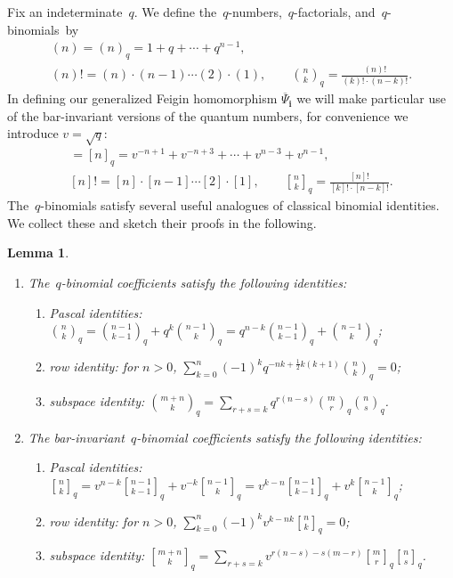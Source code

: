 \documentclass[11pt]{article}
\numberwithin{equation}{section}
\newtheorem{Lemma}[Theorem]{Lemma}
\begin{document}
Fix an indeterminate~$q$.
We def\/ine the~$q$-numbers,~$q$-factorials, and~$q$-binomials~by
\begin{gather*}
(n)=(n)_q=1+q+\cdots+q^{n-1},
\\
(n)!=(n)\cdot(n-1)\cdots(2)\cdot(1),
\qquad
{n\choose k}_q=\frac{(n)!}{(k)!\cdot(n-k)!}.
\end{gather*}
In def\/ining our generalized Feigin homomorphism $\overline\Psi_\mathbf{i}$ we will make particular use of the
bar-invariant versions of the quantum numbers, for convenience we introduce $v=\sqrt{q}$:
\begin{gather*}
[n]=[n]_q=v^{-n+1}+v^{-n+3}+\cdots+v^{n-3}+v^{n-1},
\\
[n]!=[n]\cdot[n-1]\cdots[2]\cdot[1],
\qquad
{n\brack k}_q=\frac{[n]!}{[k]!\cdot[n-k]!}.
\end{gather*}
The~$q$-binomials satisfy several useful analogues of classical binomial identities.
We collect these and sketch their proofs in the following.
\begin{Lemma}\label{lem:binomial_identities}\qquad
\begin{enumerate}\itemsep=0pt
\item[$1.$] The~$q$-binomial coefficients satisfy the following identities:
\begin{enumerate}[\upshape (a)]\itemsep=0pt
\item Pascal identities: ${n\choose k}_q={n-1\choose k-1}_q+q^k{n-1\choose k}_q=q^{n-k}{n-1\choose k-1}_q+{n-1\choose k}_q$;
\item row identity: for $n>0$, $\sum\limits_{k=0}^n (-1)^k q^{-nk+\frac{1}{2} k(k+1)}{n\choose k}_q=0$;
\item subspace identity: ${m+n\choose k}_q=\sum\limits_{r+s=k}q^{r(n-s)}{m\choose r}_q{n\choose s}_q$.
\end{enumerate}
\item[$2.$] The bar-invariant~$q$-binomial coefficients satisfy the following identities:
\begin{enumerate}[\upshape (a)]\itemsep=0pt
\item Pascal identities: ${n\brack k}_q=v^{n-k}{n-1\brack k-1}_q+v^{-k}{n-1\brack k}_q=v^{k-n}{n-1\brack k-1}_q+v^k{n-1\brack k}_q$;
\item row identity: for $n>0$, $\sum\limits_{k=0}^n (-1)^k v^{k-nk} {n\brack k}_q=0$;
\item subspace identity: ${m+n\brack k}_q=\sum\limits_{r+s=k}v^{r(n-s)-s(m-r)}{m\brack r}_q{n\brack s}_q$.
\end{enumerate}
\end{enumerate}
\end{Lemma}
\end{document}
